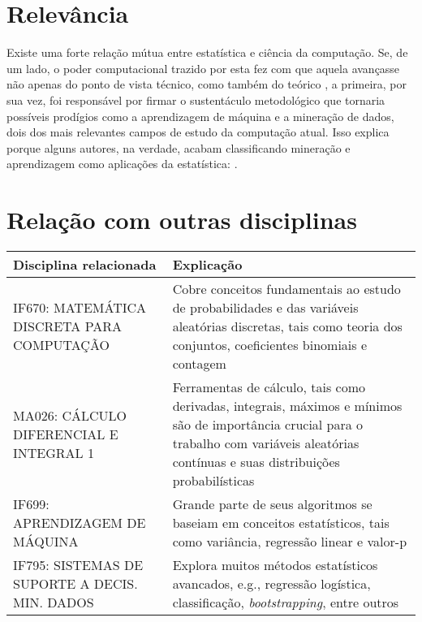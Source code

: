 \documentclass[10pt]{article}
\begin{document}
\section{Relevância}
Existe uma forte relação mútua entre estatística e ciência da computação. Se, de um lado, o poder computacional trazido por esta fez com que aquela avançasse não apenas do ponto de vista técnico, como também do teórico \cite{lauro}, a primeira, por sua vez, foi responsável por firmar o sustentáculo metodológico que tornaria possíveis prodígios como a aprendizagem de máquina e a mineração de dados, dois dos mais relevantes campos de estudo da computação atual. Isso explica porque alguns autores, na verdade, acabam classificando mineração e aprendizagem como aplicações  da estatística: \textit{} \cite{wasserman}.

\section{Relação com outras disciplinas}
\begin{tabu}{ | X[l] | X[l, 1.7] | }
    \hline
    \textbf{Disciplina relacionada} & \textbf{Explicação} \\
    \hline
    IF670: MATEMÁTICA DISCRETA PARA COMPUTAÇÃO & Cobre conceitos fundamentais ao estudo de probabilidades e das variáveis  aleatórias discretas, tais como teoria dos conjuntos, coeficientes binomiais e contagem \\
    \hline
    MA026: CÁLCULO DIFERENCIAL E INTEGRAL 1 & Ferramentas de cálculo, tais como derivadas, integrais, máximos e mínimos são de importância crucial para o trabalho com variáveis aleatórias contínuas e suas distribuições probabilísticas \\
    \hline
    IF699: APRENDIZAGEM DE MÁQUINA & Grande parte de seus algoritmos se baseiam em conceitos estatísticos, tais como variância, regressão linear e valor-p \\
    \hline
    IF795: SISTEMAS DE SUPORTE A DECIS. MIN. DADOS & Explora muitos métodos estatísticos avancados, e.g., regressão logística, classificação, \textit{bootstrapping}, entre outros \\
    \hline
\end{tabu}
    
    
\end{document}
